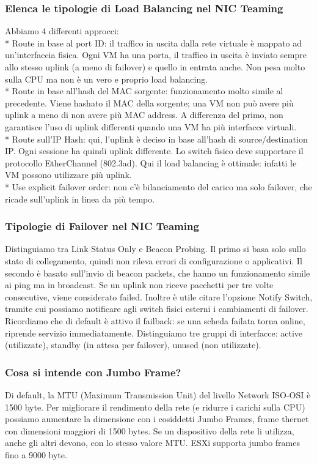 \documentclass[11pt]{article}
\begin{document}
\subsubsection{Elenca le tipologie di Load Balancing nel NIC Teaming}
Abbiamo 4 differenti approcci:
\\* Route in base al port ID: il traffico in uscita dalla rete virtuale è mappato ad un'interfaccia fisica. Ogni VM ha una porta, il traffico in uscita è inviato sempre allo stesso uplink (a meno di failover) e quello in entrata anche. Non pesa molto sulla CPU ma non è un vero e proprio load balancing.
\\* Route in base all'hash del MAC sorgente: funzionamento molto simile al precedente. Viene hashato il MAC della sorgente; una VM non può avere più uplink a meno di non avere più MAC address. A differenza del primo, non garantisce l'uso di uplink differenti quando una VM ha più interfacce virtuali.
\\* Route sull'IP Hash: qui, l'uplink è deciso in base all'hash di source/destination IP. Ogni sessione ha quindi uplink differente. Lo switch fisico deve supportare il protocollo EtherChannel (802.3ad). Qui il load balancing è ottimale: infatti le VM possono utilizzare più uplink.
\\* Use explicit failover order: non c'è bilanciamento del carico ma solo failover, che ricade sull'uplink in linea da più tempo.

\subsubsection{Tipologie di Failover nel NIC Teaming}
Distinguiamo tra Link Status Only e Beacon Probing. Il primo si basa solo sullo stato di collegamento, quindi non rileva errori di configurazione o applicativi. Il secondo è basato sull'invio di beacon packets, che hanno un funzionamento simile ai ping ma in broadcast. Se un uplink non riceve pacchetti per tre volte consecutive, viene considerato failed. Inoltre è utile citare l'opzione Notify Switch, tramite cui possiamo notificare agli switch fisici esterni i cambiamenti di failover. Ricordiamo che di default è attivo il failback: se una scheda failata torna online, riprende servizio immediatamente. Distinguiamo tre gruppi di interfacce: active (utilizzate), standby (in attesa per failover), unused (non utilizzate).

\subsubsection{Cosa si intende con Jumbo Frame?}
Di default, la MTU (Maximum Transmission Unit) del livello Network ISO-OSI è 1500 byte. Per migliorare il rendimento della rete (e ridurre i carichi sulla CPU) possiamo aumentare la dimensione con i cosiddetti Jumbo Frames, frame thernet con dimensioni maggiori di 1500 bytes. Se un dispositivo della rete li utilizza, anche gli altri devono, con lo stesso valore MTU. ESXi supporta jumbo frames fino a 9000 byte.
\end{document}
